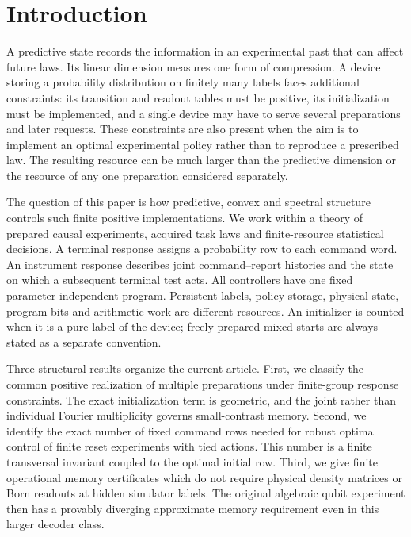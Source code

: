 \section{Introduction}\label{sec:current-overview}\label{sec:introduction}

A predictive state records the information in an experimental past that
can affect future laws.  Its linear dimension measures one form of
compression.  A device storing a probability distribution on finitely
many labels faces additional constraints: its transition and readout
tables must be positive, its initialization must be implemented, and a
single device may have to serve several preparations and later requests.
These constraints are also present when the aim is to implement an
optimal experimental policy rather than to reproduce a prescribed law.
The resulting resource can be much larger than the predictive dimension
or the resource of any one preparation considered separately.

The question of this paper is how predictive, convex and spectral
structure controls such finite positive implementations.  We work
within a theory of prepared causal experiments, acquired task laws and
finite-resource statistical decisions.  A terminal response assigns a
probability row to each command word.  An instrument response describes
joint command--report histories and the state on which a subsequent
terminal test acts.  All controllers have one fixed parameter-independent
program.  Persistent labels, policy storage, physical state, program
bits and arithmetic work are different resources.  An initializer is
counted when it is a pure label of the device; freely prepared mixed
starts are always stated as a separate convention.

Three structural results organize the current article.  First, we
classify the common positive realization of multiple preparations under
finite-group response constraints.  The exact initialization term is
geometric, and the joint rather than individual Fourier multiplicity
governs small-contrast memory.  Second, we identify the exact number of
fixed command rows needed for robust optimal control of finite reset
experiments with tied actions.  This number is a finite transversal
invariant coupled to the optimal initial row.  Third, we give finite
operational memory certificates which do not require physical density
matrices or Born readouts at hidden simulator labels.  The original
algebraic qubit experiment then has a provably diverging approximate
memory requirement even in this larger decoder class.

